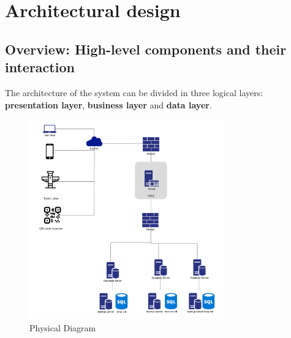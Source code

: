 \section{Architectural design}
\label{sect:overalldescription}

\subsection{Overview: High-level components and their interaction}
\label{subsect:Overview:Highlevelcomponentsandtheirinteraction}

The architecture of the system can be divided in three logical layers: \textbf{presentation layer}, \textbf{business layer} and \textbf{data layer}.

\begin{figure}[h!]
    \centering
    \includegraphics[width=0.75\textwidth]{Images/PhysicalDiagram.png}
    \caption{\label{fig:PhysicalDiagram}{Physical Diagram}}
\end{figure}

\FloatBarrier

